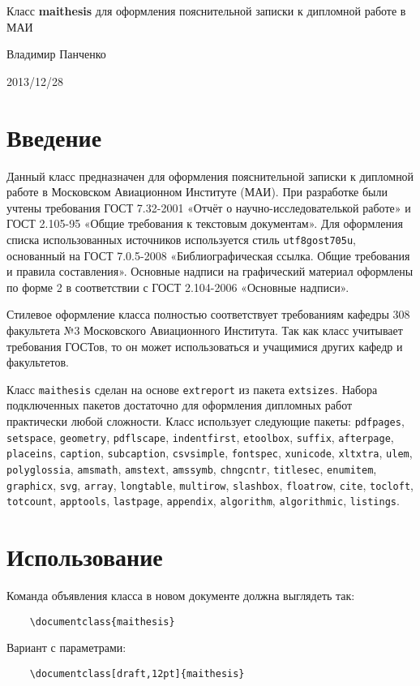 \documentclass{ltxdoc}
\newcommand{\pkg}[1]{\mbox{\texttt{#1}}}
\begin{document}
\begin{center}
\Large Класс \textbf{maithesis} для оформления пояснительной записки к дипломной работе в МАИ
\bigskip

\large Владимир Панченко
\bigskip

2013/12/28
\end{center}

\section{Введение}
Данный класс предназначен для оформления пояснительной записки к дипломной работе в Московском Авиационном Институте (МАИ). При разработке были учтены требования ГОСТ 7.32-2001 «Отчёт о научно-исследователькой работе» и ГОСТ 2.105-95 «Общие требования к текстовым документам». Для оформления списка использованных источников используется стиль \texttt{utf8gost705u}, основанный на ГОСТ 7.0.5-2008 «Библиографическая ссылка. Общие требования и правила составления». Основные надписи на графический материал оформлены по форме 2 в соответствии с ГОСТ 2.104-2006 «Основные надписи».

Стилевое оформление класса полностью соответствует требованиям кафедры 308 факультета №3 Московского Авиационного Института. Так как класс учитывает требования ГОСТов, то он может использоваться и учащимися других кафедр и факультетов.

Класс \texttt{maithesis} сделан на основе \texttt{extreport} из пакета \texttt{extsizes}. Набора подключенных пакетов достаточно для оформления дипломных работ практически любой сложности. Класс использует следующие пакеты: \pkg{pdfpages}, \pkg{setspace}, \pkg{geometry}, \pkg{pdflscape}, \pkg{indentfirst}, \pkg{etoolbox}, \pkg{suffix}, \pkg{afterpage}, \pkg{placeins}, \pkg{caption}, \pkg{subcaption}, \pkg{csvsimple}, \pkg{fontspec}, \pkg{xunicode}, \pkg{xltxtra}, \pkg{ulem}, \pkg{polyglossia}, \pkg{amsmath}, \pkg{amstext}, \pkg{amssymb}, \pkg{chngcntr}, \pkg{titlesec}, \pkg{enumitem}, \pkg{graphicx}, \pkg{svg}, \pkg{array}, \pkg{longtable}, \pkg{multirow}, \pkg{slashbox}, \pkg{floatrow}, \pkg{cite}, \pkg{tocloft}, \pkg{totcount}, \pkg{apptools}, \pkg{lastpage}, \pkg{appendix}, \pkg{algorithm}, \pkg{algorithmic}, \pkg{listings}.

\section{Использование}
Команда объявления класса в новом документе должна выглядеть так:
\begin{verbatim}
	\documentclass{maithesis}
\end{verbatim}
Вариант с параметрами:
\begin{verbatim}
	\documentclass[draft,12pt]{maithesis}
\end{verbatim}
\end{document}
